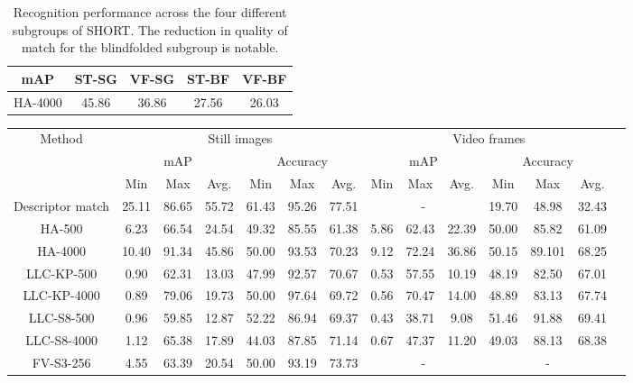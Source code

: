 \begin{table}[h]
\centering
  \begin{tabular}{ccccc}
   \toprule
    mAP & ST-SG & VF-SG & ST-BF & VF-BF \\
	\midrule
    HA-4000                    & 45.86    & 36.86   & 27.56 & 26.03\\
	\bottomrule
    \end{tabular}
    \caption{Recognition performance across the four different subgroups of SHORT. The reduction in quality of match for the blindfolded subgroup is notable.}
    \label{table:sightedVSblindfolded}
\end{table}


\begin{table}
\centering
\begin{adjustbox}{max width=1.2\textwidth,center}
\begin{tabular}{cccccccccccccc}
   \toprule
\multirow{3}{*}{Method} & \multicolumn{6}{c}{Still images} & \multicolumn{6}{c}{Video frames}\\
\cline{2-13} 
 &  \multicolumn{3}{c}{mAP} & \multicolumn{3}{c}{Accuracy} & \multicolumn{3}{c}{mAP} & \multicolumn{3}{c}{ Accuracy}\\
& Min & Max & Avg. & Min & Max & Avg. & Min & Max & Avg. & Min & Max & Avg.\\
\hline \hline 
Descriptor match & 25.11 & 86.65 & 55.72 & 61.43 & 95.26 & 77.51 & \multicolumn{3}{c}{-} & 19.70 & 48.98 & 32.43\\
\hline
HA-500 & 6.23 & 66.54 & 24.54 & 49.32 & 85.55 & 61.38 & 5.86 & 62.43 & 22.39 &50.00 & 85.82 & 61.09\\
\hline
HA-4000 & 10.40 & 91.34 & 45.86 & 50.00 & 93.53 & 70.23 & 9.12 & 72.24 & 36.86 & 50.15 & 89.101 & 68.25 \\
\hline
LLC-KP-500 & 0.90 & 62.31 & 13.03 & 47.99 & 92.57 & 70.67  & 0.53 & 57.55 & 10.19 & 48.19 & 82.50 & 67.01\\
\hline
LLC-KP-4000 & 0.89 & 79.06 & 19.73 & 50.00 & 97.64 & 69.72 & 0.56 & 70.47 & 14.00 & 48.89 & 83.13 & 67.74 \\
\hline
LLC-S8-500 & 0.96 & 59.85 & 12.87 & 52.22 & 86.94 & 69.37 & 0.43 & 38.71 & 9.08 & 51.46 & 91.88 & 69.41\\
\hline
LLC-S8-4000 & 1.12 & 65.38 & 17.89 & 44.03 & 87.85 & 71.14 & 0.67 & 47.37 & 11.20 & 49.03 & 88.13 & 68.38\\
\hline
FV-S3-256 & 4.55 & 63.39 & 20.54 & 50.00 & 93.19 & 73.73 & \multicolumn{3}{c}{-} & \multicolumn{3}{c}{-}\\

\end{tabular}
\end{adjustbox}
\end{table}
